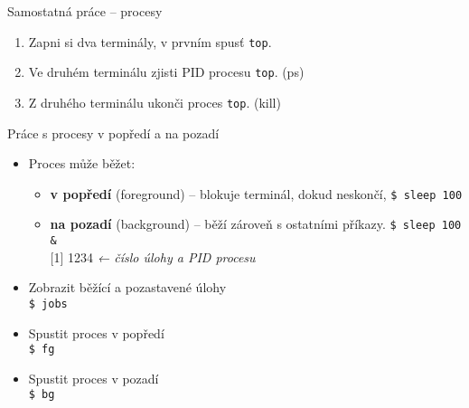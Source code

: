 \documentclass{beamer}
\begin{document}
\begin{frame}{Samostatná práce – procesy}
	\begin{enumerate}
		\item Zapni si dva terminály, v prvním spusť \texttt{top}.
		\item Ve druhém terminálu zjisti PID procesu \texttt{top}. (ps)
		\item Z druhého terminálu ukonči proces \texttt{top}. (kill)
	\end{enumerate}
\end{frame}
	
\begin{frame}[fragile]{Práce s procesy v popředí a na pozadí}
	\begin{itemize}
		\item Proces může běžet:
		\begin{itemize}
			\item \textbf{v popředí} (foreground) – blokuje terminál, dokud neskončí,
			\hspace{2em}\texttt{\$ sleep 100} \\
			\item \textbf{na pozadí} (background) – běží zároveň s ostatními příkazy.
			\hspace{2em}\texttt{\$ sleep 100 \&} \\
			\hspace{1em}[1] 1234  \textit{← číslo úlohy a PID procesu} \\[0.4em]
		\end{itemize}
		\vspace{1em}
		\item Zobrazit běžící a pozastavené úlohy \\
		\hspace{2em}\texttt{\$ jobs} \\
		\item Spustit proces v popředí \\
		\hspace{2em}\texttt{\$ fg} \\
		\item Spustit proces v pozadí \\
		\hspace{2em}\texttt{\$ bg} \\
	\end{itemize}
	
\end{frame}
\end{document}
